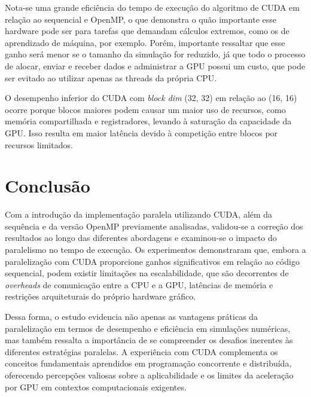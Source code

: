 \documentclass[12pt]{article}
\begin{document}
Nota-se uma grande eficiência do tempo de execução do algoritmo de CUDA em
relação ao sequencial e OpenMP, o que demonstra o quão importante esse hardware
pode ser para tarefas que demandam cálculos extremos, como os de aprendizado de
máquina, por exemplo. Porém, importante ressaltar que esse ganho será menor se
o tamanho da simulação for reduzido, já que todo o processo de alocar, enviar e
receber dados e administrar a GPU possui um custo, que pode ser evitado ao
utilizar apenas as threads da própria CPU.

O desempenho inferior do CUDA com \textit{block dim} (32, 32) em relação ao
(16, 16) ocorre porque blocos maiores podem causar um maior uso de recursos,
como memória compartilhada e registradores, levando à saturação da capacidade
da GPU. Isso resulta em maior latência devido à competição entre blocos por
recursos limitados.

\section{Conclusão}

Com a introdução da implementação paralela utilizando CUDA, além da sequência e
da versão OpenMP previamente analisadas, validou-se a correção dos resultados
ao longo das diferentes abordagens e examinou-se o impacto do paralelismo no
tempo de execução. Os experimentos demonstraram que, embora a paralelização com
CUDA proporcione ganhos significativos em relação ao código sequencial, podem
existir limitações na escalabilidade, que são decorrentes de \textit{overheads}
de comunicação entre a CPU e a GPU, latências de memória e restrições
arquiteturais do próprio hardware gráfico.

Dessa forma, o estudo evidencia não apenas as vantagens práticas da
paralelização em termos de desempenho e eficiência em simulações numéricas, mas
também ressalta a importância de se compreender os desafios inerentes às
diferentes estratégias paralelas. A experiência com CUDA complementa os
conceitos fundamentais aprendidos em programação concorrente e distribuída,
oferecendo percepções valiosas sobre a aplicabilidade e os limites da
aceleração por GPU em contextos computacionais exigentes.



\nocite{*}
\end{document}
